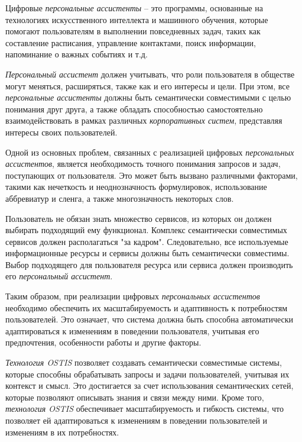 Цифровые \textit{персональные ассистенты} – это программы, основанные на технологиях искусственного интеллекта и машинного обучения, которые помогают пользователям в выполнении повседневных задач, таких как составление расписания, управление контактами, поиск информации, напоминание о важных событиях и т.д.

\textit{Персональный ассистент} должен учитывать, что роли пользователя в обществе могут меняться, расширяться, также как и его интересы и цели. 
При этом, все \textit{персональные ассистенты} должны быть семантически совместимыми с целью понимания друг друга, а также обладать способностью самостоятельно взаимодействовать в рамках различных \textit{корпоративных систем}, представляя интересы своих пользователей.

Одной из основных проблем, связанных с реализацией цифровых \textit{персональных ассистентов}, является необходимость точного понимания запросов и задач, поступающих от пользователя. Это может быть вызвано различными факторами, такими как нечеткость и неоднозначность формулировок, использование аббревиатур и сленга, а также многозначность некоторых слов.

Пользователь не обязан знать множество сервисов, из которых он должен выбирать подходящий ему функционал. Комплекс семантически совместимых сервисов должен располагаться "за кадром"{}. Следовательно, все используемые информационные ресурсы и сервисы должны быть семантически совместимы. Выбор подходящего для пользователя ресурса или сервиса должен производить его \textit{персональный ассистент}.

Таким образом, при реализации цифровых \textit{персональных ассистентов} необходимо обеспечить их масштабируемость и адаптивность к потребностям пользователей. Это означает, что система должна быть способна автоматически адаптироваться к изменениям в поведении пользователя, учитывая его предпочтения, особенности работы и другие факторы.

\textit{Технология OSTIS} позволяет создавать семантически совместимые системы, которые способны обрабатывать запросы и задачи пользователей, учитывая их контекст и смысл. Это достигается за счет использования семантических сетей, которые позволяют описывать знания и связи между ними. Кроме того, \textit{технология OSTIS} обеспечивает масштабируемость и гибкость системы, что позволяет ей адаптироваться к изменениям в поведении пользователей и изменениям в их потребностях.

